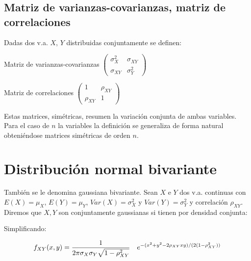 \documentclass[12pt]{report}
\begin{document}
    \subsection{Matriz de varianzas-covarianzas, matriz de correlaciones}


Dadas dos v.a. $X$, $Y$ distribuidas conjuntamente se definen:

    Matriz de varianzas-covarianzas
    $\left(\begin{array}{cc}
            \sigma_{X}^2 & \sigma_{XY}  \\
            \sigma_{XY}  &   \sigma_{Y}^2
        \end{array}\right)$

    Matriz de correlaciones
     $\left(\begin{array}{cc}
            1 & \rho_{XY}  \\
            \rho_{XY}  &   1
        \end{array}\right)$

Estas matrices, simétricas, resumen la variación conjunta de ambas variables. Para el caso de $n$ la variables la definición se generaliza de forma natural obteniéndose matrices simétricas de orden $n$.


\section{Distribución normal bivariante}

    También se le denomina gaussiana bivariante.
    Sean $X$ e $Y$ dos v.a. continuas con $E(X)=\mu_{X}$,
    $E(Y)=\mu_{Y}$, $Var(X)=\sigma_{X}^2$ y $Var(Y)=\sigma_{Y}^2$ y
    correlación $\rho_{XY}$.
    Diremos que $X,Y$ son conjuntamente gaussianas si tienen por
    densidad conjunta:


%
%


Simplificando:


$$f_{XY}(x,y)={{1}\over{2\pi\sigma_{X}\sigma_{Y}\sqrt{1-\rho_{XY}^{2}}}} \quad
e^{-(x^2+y^2-2 \rho_{XY}x y )/(2(1-\rho_{XY}^2))}$$
\end{document}
